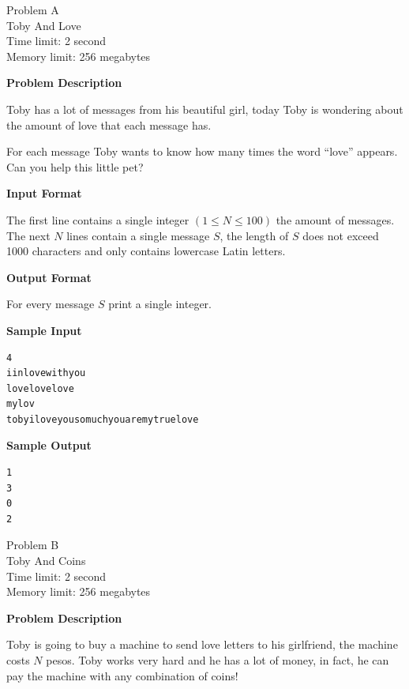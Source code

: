 \documentclass[11pt]{article}
\begin{document}
        \setcounter{page}{1}

        
        
        \begin{center}
            {\LARGE Problem A}\\
            {\Large Toby And Love}\\
            {Time limit: 2 second}\\
            {Memory limit: 256 megabytes}
        \end{center}\textbf{\large Problem Description}

Toby has a lot of messages from his beautiful girl, today Toby is wondering about
the amount of love that each message has.

For each message Toby wants to know how many times the word ``love'' appears.
Can you help this little pet?

\textbf{\large Input Format}

The first line contains a single integer $(1 \le N \le 100)$ the amount of messages.
The next $N$ lines contain a single message $S$, the length of $S$ does not exceed 1000 characters
and only contains lowercase Latin letters.

\textbf{\large Output Format}

For every message $S$ print a single integer.

\textbf{\large Sample Input}

\begin{verbatim}
4
iinlovewithyou
lovelovelove
mylov
tobyiloveyousomuchyouaremytruelove
\end{verbatim}

\textbf{\large Sample Output}

\begin{verbatim}
1
3
0
2
\end{verbatim}

\newpage

        \begin{center}
            {\LARGE Problem B}\\
            {\Large Toby And Coins}\\
            {Time limit: 2 second}\\
            {Memory limit: 256 megabytes}
        \end{center}\textbf{\large Problem Description}

Toby is going to buy a machine to send love letters to his girlfriend, the machine
costs $N$ pesos. Toby works very hard and he has a lot of money, in fact, he can
pay the machine with any combination of coins!
\end{document}
